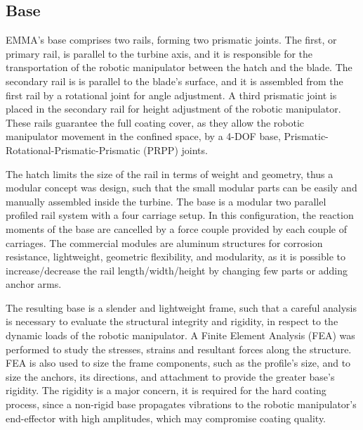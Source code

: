 \subsection{Base}

EMMA's base comprises two rails, forming two prismatic joints. The
first, or primary rail, is parallel to the turbine axis, and it is responsible
for the transportation of the robotic manipulator between the hatch and the
blade. The secondary rail is is parallel to the blade's surface, and it is
assembled from the first rail by a rotational joint for angle adjustment. A
third prismatic joint is placed in the secondary rail for height adjustment of
the robotic manipulator. These rails guarantee the full coating cover, as they
allow the robotic manipulator movement in the confined space, by a 4-DOF
base, Prismatic-Rotational-Prismatic-Prismatic (PRPP) joints. 

The hatch limits the size of the rail in terms of weight and geometry, thus a
modular concept was design, such that the small modular parts can be easily and
manually assembled inside the turbine. The base is a modular two parallel
profiled rail system %
with a four carriage setup. In this configuration, the reaction moments of the
base are cancelled by a force couple provided by each couple of carriages. The
commercial modules are aluminum structures for corrosion resistance,
lightweight, geometric flexibility, and modularity, as it is possible to
increase/decrease the rail length/width/height by changing few parts or adding
anchor arms. %

The resulting base is a slender and lightweight frame, such that a careful
analysis is necessary to evaluate the structural integrity and rigidity, in
respect to the dynamic loads of the robotic manipulator. A Finite Element
Analysis (FEA) was performed to study the stresses, strains and resultant forces
along the structure. FEA is also used to size the frame components, such as
the profile's size, and to size the anchors, its directions, and attachment to
provide the greater base's rigidity. The rigidity is a major concern, it is
required for the hard coating process, since a non-rigid base propagates
vibrations to the robotic manipulator's end-effector with high amplitudes, which
may compromise coating quality.


